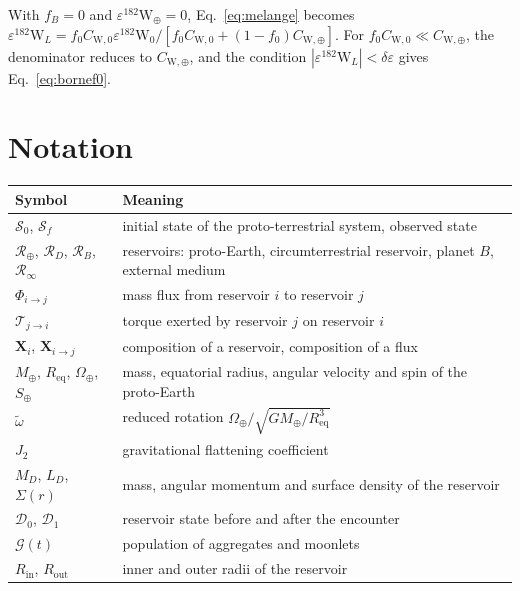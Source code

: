 \documentclass[11pt,a4paper,openany]{report}
\newcommand{\Mt}{M_{\oplus}}
\newcommand{\Req}{R_{\mathrm{eq}}}
\newcommand{\RT}{\mathcal{R}_{\oplus}}
\newcommand{\RD}{\mathcal{R}_{D}}
\newcommand{\RB}{\mathcal{R}_{B}}
\newcommand{\Rinf}{\mathcal{R}_{\infty}}
\begin{document}
With $f_B=0$ and $\varepsilon^{182}\mathrm{W}_\oplus=0$, Eq.~\eqref{eq:melange} becomes
$\varepsilon^{182}\mathrm{W}_L=f_0C_{\mathrm{W},0}\varepsilon^{182}\mathrm{W}_0/
[f_0C_{\mathrm{W},0}+(1-f_0)C_{\mathrm{W},\oplus}]$. For
$f_0C_{\mathrm{W},0}\ll C_{\mathrm{W},\oplus}$, the denominator reduces to $C_{\mathrm{W},\oplus}$,
and the condition $|\varepsilon^{182}\mathrm{W}_L|<\delta\varepsilon$ gives
Eq.~\eqref{eq:bornef0}.

\chapter{Notation}
\label{app:notations}

\small
\begin{longtable}{>{\raggedright\arraybackslash}p{3.2cm}>{\raggedright\arraybackslash}p{11.6cm}}
\toprule
\textbf{Symbol} & \textbf{Meaning} \\
\midrule
\endhead
$\mathcal{S}_0$, $\mathcal{S}_f$ & initial state of the proto-terrestrial system, observed state \\
$\RT$, $\RD$, $\RB$, $\Rinf$ & reservoirs: proto-Earth, circumterrestrial reservoir, planet $B$, external medium \\
$\Phi_{i\to j}$ & mass flux from reservoir $i$ to reservoir $j$ \\
$\boldsymbol{\mathcal{T}}_{j\to i}$ & torque exerted by reservoir $j$ on reservoir $i$ \\
$\mathbf{X}_i$, $\mathbf{X}_{i\to j}$ & composition of a reservoir, composition of a flux \\
$\Mt$, $\Req$, $\Omega_\oplus$, $S_\oplus$ & mass, equatorial radius, angular velocity and spin of the proto-Earth \\
$\tilde\omega$ & reduced rotation $\Omega_\oplus/\sqrt{G\Mt/\Req^3}$ \\
$J_2$ & gravitational flattening coefficient \\
$M_D$, $L_D$, $\Sigma(r)$ & mass, angular momentum and surface density of the reservoir \\
$\mathcal{D}_0$, $\mathcal{D}_1$ & reservoir state before and after the encounter \\
$\mathcal{G}(t)$ & population of aggregates and moonlets \\
$R_{\mathrm{in}}$, $R_{\mathrm{out}}$ & inner and outer radii of the reservoir \\

\end{longtable}
\end{document}
